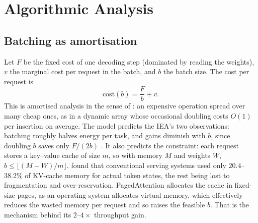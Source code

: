 \documentclass[11pt]{article}
\theoremstyle{definition}
\theoremstyle{remark}
\begin{document}
\section{Algorithmic Analysis}\label{sec:algorithms}

\subsection{Batching as amortisation}\label{sec:batch}
Let $F$ be the fixed cost of one decoding step (dominated by reading the weights), $v$ the marginal cost per request in the batch, and $b$ the batch size. The cost per request is
\begin{equation}
  \text{cost}(b) = \frac{F}{b} + v .
\end{equation}
This is amortised analysis in the sense of \citet{clrs}: an expensive operation spread over many cheap ones, as in a dynamic array whose occasional doubling costs $O(1)$ per insertion on average. The model predicts the IEA's two observations: batching roughly halves energy per task, and gains diminish with $b$, since doubling $b$ saves only $F/(2b)$ \citep{iea2025}. It also predicts the constraint: each request stores a key--value cache of size $m$, so with memory $M$ and weights $W$, $b \le \lfloor (M-W)/m \rfloor$. \citet{kwon2023} found that conventional serving systems used only $20.4$--$38.2\%$ of KV-cache memory for actual token states, the rest being lost to fragmentation and over-reservation. PagedAttention allocates the cache in fixed-size pages, as an operating system allocates virtual memory, which effectively reduces the wasted memory per request and so raises the feasible $b$. That is the mechanism behind its $2$--$4\times$ throughput gain.
\end{document}
